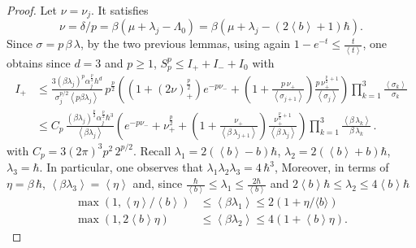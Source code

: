 \documentclass[11pt]{amsart}
\theoremstyle{plain}
\theoremstyle{definition}
\newcommand		{\lt}			{\left}				%
\newcommand		{\rt}			{\right}			%
\renewcommand	{\(}			{\lt(}
\renewcommand	{\)}			{\rt)}
\newcommand		{\bangle}[1]	{\lt\langle #1\rt\rangle}
\newcommand		{\weight}[1]	{\bangle{#1}}	%
\newcommand		{\hd}		{h^d}
\begin{document}
	\begin{proof}
		Let $\nu = \nu_j$. It satisfies
        \begin{equation*}
            \nu = \delta/p = \beta\lt(\mu + \lambda_j - \Lambda_0\rt) = \beta\lt(\mu + \lambda_j - \lt(2\weight{b}+1\rt)\hbar\rt) .
        \end{equation*}
        Since $\sigma = p\, \beta \, \lambda$, by the two previous lemmas, using again $1-e^{-t} \leq \frac{t}{\weight{t}}$, one obtains since $d=3$ and $p\geq 1$, $S_p^p \leq I_+ + I_- + I_0$ with
		\begin{align*}
			I_+ &\leq \frac{3\lt(\beta \lambda_j\rt)^p \alpha_j^{\frac{p}{2}}\hd}{\sigma_j^{p/2}\weight{p\beta\lambda_j}} \, p^\frac{p}{2}\lt(\lt(1 + \lt(2\nu\rt)_+^\frac{p}{2} \rt) e^{-p\nu_-} + \lt(1+\frac{p\,\nu_+}{\weight{\sigma_{j+1}}}\rt) \frac{p\,\nu_+^{\frac{p}{2}+1}}{\weight{\sigma_j}} \rt) \prod_{k=1}^3 \frac{\weight{\sigma_k}}{\sigma_k}
            \\
            &\leq C_p \, \frac{\lt(\beta \lambda_j\rt)^\frac{p}{2} \alpha_j^{\frac{p}{2}} \hbar^3}{\weight{\beta\lambda_j}} \lt(e^{-p\nu_-} + \nu_+^\frac{p}{2} + \lt(1+\frac{\nu_+}{\weight{\beta \, \lambda_{j+1}}}\rt) \frac{\nu_+^{\frac{p}{2}+1}}{\weight{\beta \, \lambda_j}} \rt) \prod_{k=1}^3 \frac{\weight{\beta \, \lambda_k}}{\beta \, \lambda_k} \, .
		\end{align*}
        with $C_p = 3\lt(2\pi\rt)^3 p^2\, 2^{p/2}$. Recall $\lambda_1 = 2\lt(\weight{b}-b\rt)\hbar$, $\lambda_2 = 2\lt(\weight{b}+b\rt)\hbar$, $\lambda_3 = \hbar$. In particular, one observes that $\lambda_1\lambda_2\lambda_3 = 4 \,\hbar^3$, Moreover, in terms of $\eta = \beta\,\hbar$, $\weight{\beta\lambda_3} = \weight{\eta}$ and, since $\frac{\hbar}{\weight{b}} \leq \lambda_1 \leq \frac{2\hbar}{\weight{b}}$ and $2\weight{b}\hbar \leq \lambda_2 \leq 4\weight{b}\hbar$
        \begin{align*}
            \max(1,\weight{\eta}/\weight{b}) &\leq \weight{\beta\lambda_1} \leq 2\lt(1+\eta/\langle b\rangle\rt)
            \\
            \max(1,2\weight{b}\eta) &\leq \weight{\beta\lambda_2} \leq 4\lt(1+\weight{b}\eta\rt) .
        \end{align*}


\end{proof}
\end{document}
